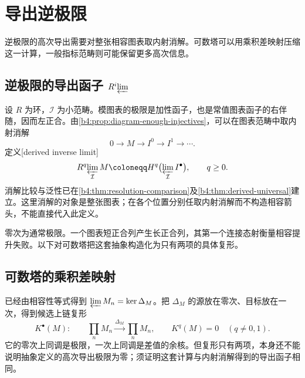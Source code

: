 
\section{导出逆极限}
\label{b4:sec:1303}

逆极限的高次导出需要对整张相容图表取内射消解。可数塔可以用乘积差映射压缩这一计算，一般指标范畴则可能保留更多高次信息。

%
%

\subsection{\texorpdfstring{逆极限的导出函子 \(R^i\!\varprojlim\)}{逆极限的导出函子}}
\label{b4:subsec:1303:01}

设 \(R\) 为环，\(\mathcal I\) 为小范畴。模图表的极限是加性函子，也是常值图表函子的右伴随，因而左正合。由\cref{b4:prop:diagram-enough-injectives}，可以在图表范畴中取内射消解
\[
	0\longrightarrow M\longrightarrow I^0\longrightarrow I^1\longrightarrow\cdots.
\]
定义[derived inverse limit]
\[
	R^q\!\varprojlim_{\mathcal I} M \coloneqq H^q\bigl(\varprojlim_{\mathcal I} I^\bullet\bigr),\qquad q\ge0.
\]
消解比较与泛性已在\cref{b4:thm:resolution-comparison}及\cref{b4:thm:derived-universal}建立。这里消解的对象是整张图表；在各个位置分别任取内射消解而不构造相容箭头，不能直接代入此定义。

\ProseParagraphBreak
零次为通常极限。一个图表短正合列产生长正合列，其第一个连接态射衡量相容提升失败。以下对可数塔把这套抽象构造化为只有两项的具体复形。

\subsection{可数塔的乘积差映射}
\label{b4:subsec:1303:02}

已经由相容性等式得到 \(\varprojlim M_n=\ker\Delta_M\)。把 \(\Delta_M\) 的源放在零次、目标放在一次，得到候选上链复形
\[
	K^\bullet(M):\qquad \prod_n M_n\xrightarrow{\Delta_M}\prod_n M_n, \qquad K^q(M)=0\quad(q\ne0,1).
\]
它的零次上同调是极限，一次上同调是差值的余核。但复形只有两项，本身还不能说明抽象定义的高次导出极限为零；须证明这套计算与内射消解得到的导出函子相同。

